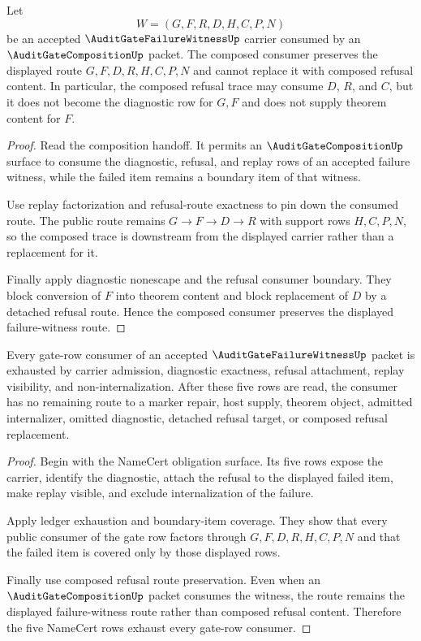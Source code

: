 \begin{theorem}
\label{thm:audit-gate-failure-witness-composed-refusal-route-preservation}
Let
$$
W=(G,F,R,D,H,C,P,N)
$$
be an accepted $\AuditGateFailureWitnessUp$ carrier consumed by an $\AuditGateCompositionUp$ packet. The composed consumer preserves the displayed route $G,F,D,R,H,C,P,N$ and cannot replace it with composed refusal content. In particular, the composed refusal trace may consume $D$, $R$, and $C$, but it does not become the diagnostic row for $G,F$ and does not supply theorem content for $F$.
\end{theorem}
\begin{proof}
Read the composition handoff. It permits an $\AuditGateCompositionUp$ surface to consume the diagnostic, refusal, and replay rows of an accepted failure witness, while the failed item remains a boundary item of that witness.

Use replay factorization and refusal-route exactness to pin down the consumed route. The public route remains $G \to F \to D \to R$ with support rows $H,C,P,N$, so the composed trace is downstream from the displayed carrier rather than a replacement for it.

Finally apply diagnostic nonescape and the refusal consumer boundary. They block conversion of $F$ into theorem content and block replacement of $D$ by a detached refusal route. Hence the composed consumer preserves the displayed failure-witness route.
\end{proof}

\begin{theorem}
\label{thm:audit-gate-failure-witness-gate-row-exhaustion}
Every gate-row consumer of an accepted $\AuditGateFailureWitnessUp$ packet is exhausted by carrier admission, diagnostic exactness, refusal attachment, replay visibility, and non-internalization. After these five rows are read, the consumer has no remaining route to a marker repair, host supply, theorem object, admitted internalizer, omitted diagnostic, detached refusal target, or composed refusal replacement.
\end{theorem}
\begin{proof}
Begin with the NameCert obligation surface. Its five rows expose the carrier, identify the diagnostic, attach the refusal to the displayed failed item, make replay visible, and exclude internalization of the failure.

Apply ledger exhaustion and boundary-item coverage. They show that every public consumer of the gate row factors through $G,F,D,R,H,C,P,N$ and that the failed item is covered only by those displayed rows.

Finally use composed refusal route preservation. Even when an $\AuditGateCompositionUp$ packet consumes the witness, the route remains the displayed failure-witness route rather than composed refusal content. Therefore the five NameCert rows exhaust every gate-row consumer.
\end{proof}

